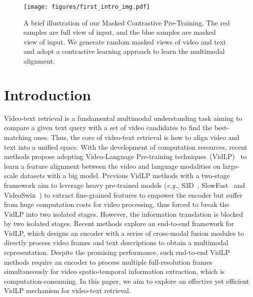 \documentclass[10pt,twocolumn,letterpaper]{article}
\begin{document}
\begin{figure}[t]
  \centering
  \texttt{[image: figures/first\_intro\_img.pdf]}
   \caption{A brief illustration of our Masked Contrastive Pre-Training. The red samples are full view of input, and the blue samples are masked view of input. We generate random masked views of video and text and adopt a contrastive learning approach to learn the multimodal alignment.}
   \label{fig:brief intro}
\end{figure}


\vspace{-1mm}\section{Introduction}
\label{sec:intro}
Video-text retrieval is a fundamental multimodal understanding task aiming to compare a given text query with a set of video candidates to find the best-matching ones.
Thus, the core of video-text retrieval is how to align video and text into a unified space. 
With the development of computation resources, recent methods propose adopting Video-Language Pre-training techniques~(VidLP)~\cite{actbert, all-in-one, BridgeFormer, miles, UniVL, hero, Frozen, clipbert} to learn a feature alignment between the video and language modalities on large-scale datasets with a big model. 
Previous VidLP methods with a two-stage framework aim to leverage heavy pre-trained models (\emph{e.g.}, S3D~\cite{s3d}, SlowFast~\cite{slowfast} and VideoSwin~\cite{videoswin}) to extract fine-grained features to empower the encoder but suffer from huge computation costs for video processing, thus forced to break the VidLP into two isolated stages. 
However, the information translation is blocked by two isolated stages. 
Recent methods explore an end-to-end framework for VidLP, which designs an encoder with a series of cross-modal fusion modules to directly process video frames and text descriptions to obtain a multimodal representation. Despite the promising performance, such end-to-end VidLP methods require an encoder to process multiple full-resolution frames simultaneously for video spatio-temporal information extraction, which is computation-consuming. 
In this paper, we aim to explore an effective yet efficient VidLP mechanism for video-text retrieval.
\end{document}

